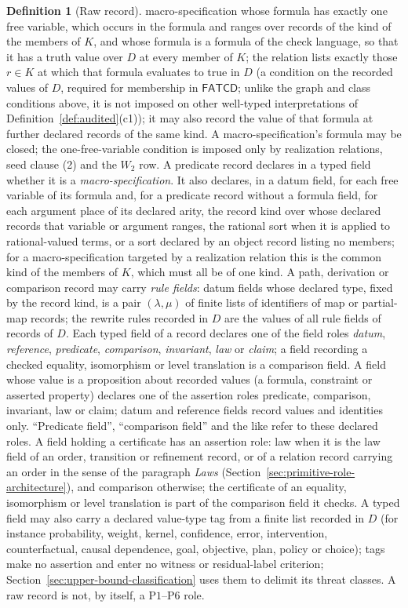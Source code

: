 \documentclass[11pt]{article}
\theoremstyle{definition}
\newtheorem{definition}[theorem]{Definition}
\newcommand{\FATCD}{\ensuremath{\mathsf{FATCD}}}
\newcommand{\Pone}{\ensuremath{\mathrm{P1}}}
\newcommand{\Psix}{\ensuremath{\mathrm{P6}}}
\begin{document}
\begin{definition}[Raw record]
macro-specification whose formula has exactly one free variable, which occurs in the formula and
ranges over records of the kind of the members of \(K\), and whose formula is a formula of the check language, so that it has a truth value over \(D\) at every member of \(K\); the relation lists
exactly those \(r\in K\) at which that formula evaluates to true in \(D\) (a condition on the recorded values of \(D\), required for membership in \FATCD{}; unlike the graph and class conditions above, it is not imposed on other well-typed interpretations of Definition~\ref{def:audited}(c1)); it may also record the value of that formula at further declared records
of the same kind. A macro-specification's formula may be closed; the
one-free-variable condition is imposed only by realization relations, seed
clause (2) and the \(W_2\) row. A predicate record declares in a
typed field whether it is a \emph{macro-specification}. It also declares, in a datum field, for each free variable of its formula and, for a predicate record without a formula field, for each argument place of its declared arity, the record kind over whose declared records that variable or argument ranges, the rational sort when it is applied to rational-valued terms, or a sort declared by an object record listing no members; for a macro-specification targeted by a realization relation this is the common kind of the members of \(K\), which must all be of one kind. A path, derivation or comparison
record may carry \emph{rule fields}: datum fields whose declared type, fixed by
the record kind, is a pair \((\lambda,\mu)\) of finite lists of identifiers of map
or partial-map records; the rewrite rules recorded in \(D\) are the values of
all rule fields of records of \(D\). Each typed field of a
record declares one of the field roles \emph{datum}, \emph{reference},
\emph{predicate}, \emph{comparison}, \emph{invariant}, \emph{law} or
\emph{claim}; a field recording a checked equality, isomorphism or level
translation is a comparison field. A field whose value is a proposition about
recorded values (a formula, constraint or asserted property) declares one of
the assertion roles predicate, comparison, invariant, law or claim; datum and
reference fields record values and identities only. ``Predicate field'', ``comparison field''
and the like refer to these declared roles. A field holding a certificate has
an assertion role: law when it is the law field of an order, transition or
refinement record, or of a relation record carrying an order in the sense of
the paragraph \emph{Laws} (Section~\ref{sec:primitive-role-architecture}), and
comparison otherwise; the certificate of an equality,
isomorphism or level translation is part of the comparison field it checks. A typed field may also carry a
declared value-type tag from a finite list recorded in \(D\) (for instance
probability, weight, kernel, confidence, error, intervention, counterfactual,
causal dependence, goal, objective, plan, policy or choice); tags make no
assertion and enter no witness or residual-label criterion;
Section~\ref{sec:upper-bound-classification} uses them to delimit its threat
classes. A raw record is not, by itself, a
\Pone{}--\Psix{} role.
\end{definition}
\end{document}
